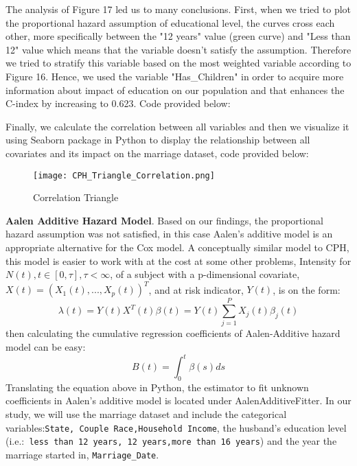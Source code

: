 \documentclass[10pt,twocolumn]{article}
\begin{document}
The analysis of Figure 17 led us to many conclusions. First, when we tried to plot the proportional hazard assumption of educational level, the curves cross each other, more specifically between the "12 years" value (green curve) and "Less than 12" value which means that the variable doesn't satisfy the assumption. Therefore we tried to stratify this variable based on the most weighted variable according to Figure 16. Hence, we used the variable "Has\_Children" in order to acquire more information about impact of education on our population and that enhances the C-index by increasing to 0.623. Code provided below:

Finally, we calculate the correlation between all variables and then we visualize it using Seaborn package in Python to display the relationship between all covariates and its impact on the marriage dataset, code provided below:

\begin{figure}[!htb]
\centering
\texttt{[image: CPH\_Triangle\_Correlation.png]}
\caption{Correlation Triangle}
\label{Fig:CPH_Triangle_Correlation}
\end{figure} 
\textbf{Aalen Additive Hazard Model}.
Based on our findings, the proportional hazard assumption was not satisfied, in this case Aalen's additive model is an appropriate alternative for the Cox model. A conceptually similar model to CPH, this model is easier to work with at the cost at some other problems, Intensity for $N(t), t \in  [0,\tau ], \tau < \infty$, of a subject with a p-dimensional covariate, $X(t) = (X_1(t), ..., X_p(t))^T$, and at risk indicator, $Y (t)$, is on the form:
\begin{equation}
\lambda(t) = Y(t)X^T(t)\beta(t) = Y(t)\sum_{j=1}^PX_j(t)\beta_j(t) 
\end{equation}
then calculating the cumulative regression coefficients of  Aalen-Additive hazard model can be easy:
\begin{equation}
B(t) = \int_0^t \beta(s)ds
\end{equation} 
Translating the equation above in Python, the estimator to fit unknown coefficients in Aalen’s additive model is located under AalenAdditiveFitter. In our study, we will use the marriage dataset and include the categorical variables:\texttt{State, Couple Race,Household Income}, the husband's education level  (i.e.:\texttt{ less than 12 years, 12 years,more than 16 years}) and the year the marriage started in, \texttt{Marriage\_Date}. 
\end{document}
